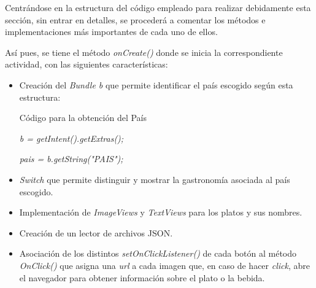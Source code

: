\documentclass[letterpaper,twocolumn,openany,nodeprecatedcode,dvipsnames,nomultitoc]{dndbook}
\begin{document}
\begin{justify}
\vspace{5pt}

\par 
Centrándose en la estructura del código empleado para realizar debidamente esta sección, sin entrar en detalles, se procederá a comentar los métodos e implementaciones más importantes de cada uno de ellos. 

\vspace{5pt}

\par 
Así pues, se tiene el método \textit{onCreate()} donde se inicia la correspondiente actividad, con las siguientes características:

\vspace{5pt}

\par 
\begin{itemize}

    \item Creación del \textit{Bundle b} que permite identificar el país escogido según esta estructura: 
    \begin{DndSidebar}{Código para la obtención del País}
    \centering
  \par \textit{b = getIntent().getExtras();}
    \par \textit{pais = b.getString("PAIS");}
    \end{DndSidebar}


    \item \textit{Switch} que permite distinguir y mostrar la gastronomía asociada al país escogido.
    \vspace{5pt}

    \item Implementación de \textit{ImageViews} y \textit{TextViews} para los platos y sus nombres.
    \vspace{5pt}
    
    \item Creación de un lector de archivos JSON.
    \vspace{5pt}

    \item Asociación de los distintos \textit{setOnClickListener()} de cada botón al método \textit{OnClick()} que asigna una \textit{url} a cada imagen que, en caso de hacer \textit{click}, abre el navegador para obtener información sobre el plato o la bebida.
    \vspace{5pt}

\end{itemize}


\end{justify}
\end{document}
